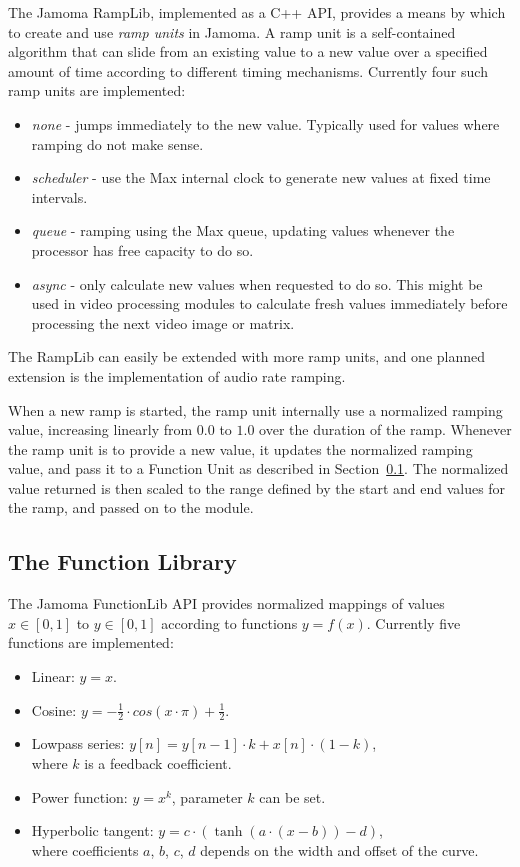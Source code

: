 \documentclass{article}
\begin{document}
The Jamoma RampLib, implemented as a C++ API, provides a means by which to create and use \emph{ramp units} in Jamoma.  A ramp unit is a self-contained algorithm that can slide from an existing value to a new value over a specified amount of time according to different timing mechanisms. Currently four such ramp units are implemented:

\begin{itemize}
	\item \emph{none} - jumps immediately to the new value. Typically used for values where ramping do not make sense.
	\item \emph{scheduler} - use the Max internal clock to generate new values at fixed time intervals.
	\item \emph{queue} - ramping using the Max queue, updating values whenever the processor has free capacity to do so.
	\item \emph{async} - only calculate new values when requested to do so. This might be used in video processing modules to calculate fresh values immediately before processing the next video image or matrix.
\end{itemize}

The RampLib can easily be extended with more ramp units, and one planned extension is the implementation of audio rate ramping.

When a new ramp is started, the ramp unit internally use a normalized ramping value, increasing linearly from $0.0$ to $1.0$ over the duration of the ramp. Whenever the ramp unit is to provide a new value, it updates the normalized ramping value, and pass it to a Function Unit as described in Section~\ref{ssec:functionlib}. The normalized value returned is then scaled to the range defined by the start and end values for the ramp, and passed on to the module.



\subsection{The Function Library} %
\label{ssec:functionlib}

The Jamoma FunctionLib API provides normalized mappings of values $x \in [0,1]$ to $y \in [0,1]$ according to functions $y = f(x)$. Currently five functions are implemented: 

\begin{itemize}
	\item Linear: $y = x$.
	\item Cosine: $y = - \frac{1}{2} \cdot cos(x \cdot \pi ) + \frac{1}{2} $.
	\item Lowpass series: $y[n] = y[n-1] \cdot k + x[n] \cdot (1-k)$, \\ where $k$ is a feedback coefficient.
	\item Power function: $ y = x^{k} $, parameter $k$ can be set.
	\item Hyperbolic tangent: $ y = c \cdot (\tanh(a\cdot(x-b)) - d) $, \\ where coefficients $a$, $b$, $c$, $d$ depends on the width and offset of the curve.
\end{itemize}
\end{document}
